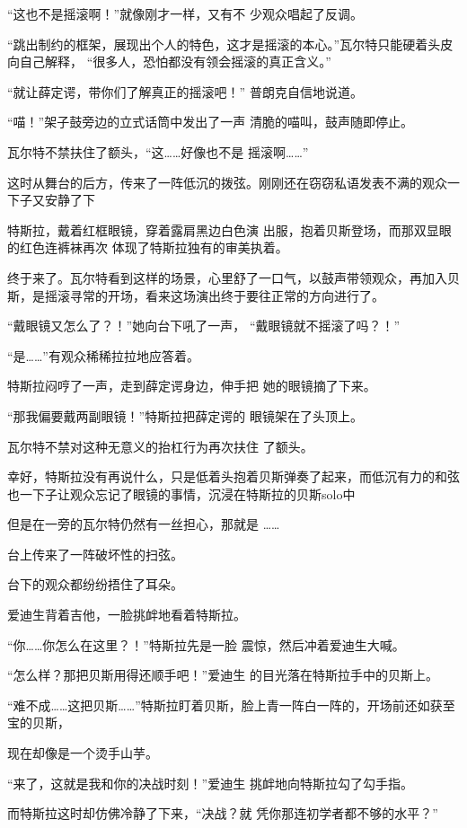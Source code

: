 \documentclass{article}
\begin{document}
“这也不是摇滚啊！”就像刚才一样，又有不
少观众唱起了反调。 

“跳出制约的框架，展现出个人的特色，这才是摇滚的本心。”瓦尔特只能硬着头皮向自己解释，
“很多人，恐怕都没有领会摇滚的真正含义。” 

“就让薛定谔，带你们了解真正的摇滚吧！”
普朗克自信地说道。 

“喵！”架子鼓旁边的立式话筒中发出了一声
清脆的喵叫，鼓声随即停止。 

瓦尔特不禁扶住了额头，“这……好像也不是
摇滚啊……” 

这时从舞台的后方，传来了一阵低沉的拨弦。刚刚还在窃窃私语发表不满的观众一下子又安静了下

特斯拉，戴着红框眼镜，穿着露肩黑边白色演
\newpage
出服，抱着贝斯登场，而那双显眼的红色连裤袜再次
体现了特斯拉独有的审美执着。 

终于来了。瓦尔特看到这样的场景，心里舒了一口气，以鼓声带领观众，再加入贝斯，是摇滚寻常的开场，看来这场演出终于要往正常的方向进行了。

“戴眼镜又怎么了？！”她向台下吼了一声，
“戴眼镜就不摇滚了吗？！” 


“是……”有观众稀稀拉拉地应答着。 

特斯拉闷哼了一声，走到薛定谔身边，伸手把
她的眼镜摘了下来。 

“那我偏要戴两副眼镜！”特斯拉把薛定谔的
眼镜架在了头顶上。 

瓦尔特不禁对这种无意义的抬杠行为再次扶住
了额头。 

\newpage

幸好，特斯拉没有再说什么，只是低着头抱着贝斯弹奏了起来，而低沉有力的和弦也一下子让观众忘记了眼镜的事情，沉浸在特斯拉的贝斯solo中

但是在一旁的瓦尔特仍然有一丝担心，那就是
…… 


台上传来了一阵破坏性的扫弦。 


台下的观众都纷纷捂住了耳朵。 


爱迪生背着吉他，一脸挑衅地看着特斯拉。 

“你……你怎么在这里？！”特斯拉先是一脸
震惊，然后冲着爱迪生大喊。 

“怎么样？那把贝斯用得还顺手吧！”爱迪生
的目光落在特斯拉手中的贝斯上。 

“难不成……这把贝斯……”特斯拉盯着贝斯，脸上青一阵白一阵的，开场前还如获至宝的贝斯，
\newpage

现在却像是一个烫手山芋。 

“来了，这就是我和你的决战时刻！”爱迪生
挑衅地向特斯拉勾了勾手指。 

而特斯拉这时却仿佛冷静了下来，“决战？就
凭你那连初学者都不够的水平？” 
\end{document}

